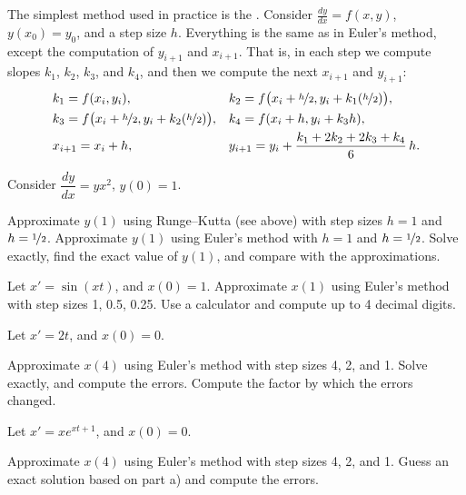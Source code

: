The simplest method used in practice is the
\emph{}.
Consider $\frac{dy}{dx}=f(x,y)$, $y(x_0) = y_0$,
and a step size $h$.  Everything is the same as in Euler's method, except
the computation of $y_{i+1}$ and $x_{i+1}$.
That is, in each step we compute slopes $k_1$, $k_2$, $k_3$, and $k_4$,
and then we compute the next $x_{i+1}$ and $y_{i+1}$:
\begin{align*}
& k_1 = f(x_i,y_i) ,
&
& k_2 = f\bigl(x_i + \nicefrac{h}{2},y_i + k_1 (\nicefrac{h}{2})\bigr) ,
\\
& k_3 = f\bigl(x_i + \nicefrac{h}{2},y_i + k_2 (\nicefrac{h}{2})\bigr) ,
&
& k_4 = f(x_i + h,y_i + k_3 h) ,
\\
& x_{i+1} = x_i + h ,
&
& y_{i+1} = y_i + \frac{k_1 + 2k_2 + 2k_3 + k_4}{6}\,h .
\end{align*}

\begin{exercise}
\pagebreak[2]
Consider $\dfrac{dy}{dx} = yx^2$, $y(0)=1$.
\begin{tasks}
\task Approximate $y(1)$
using Runge--Kutta (see above) with step sizes $h=1$ and
$h=\nicefrac{1}{2}$.
\task Approximate $y(1)$ using Euler's method with $h=1$ and
$h=\nicefrac{1}{2}$.
\task Solve exactly, find the exact value of
$y(1)$, and compare with the approximations.
\end{tasks}
\end{exercise}

\setcounter{exercise}{100}

\begin{exercise}
Let $x' = \sin(xt)$, and $x(0)=1$.
Approximate $x(1)$ using Euler's method with step sizes 1, 0.5, 0.25.
Use a calculator and compute up to 4 decimal digits.
\end{exercise}

\begin{exercise}
Let $x' = 2t$, and $x(0)=0$.
\begin{tasks}
\task Approximate $x(4)$ using Euler's method with step sizes 4, 2, and 1.
\task Solve exactly, and compute the errors.
\task Compute the factor by which the errors changed.
\end{tasks}
\end{exercise}

\begin{samepage}
\begin{exercise}
Let $x' = x e^{xt+1}$, and $x(0)=0$.
\begin{tasks}
\task Approximate $x(4)$ using Euler's method with step sizes 4, 2, and 1.
\task Guess an exact solution based on part a) and compute the errors.
\end{tasks}
\end{exercise}
\end{samepage}

